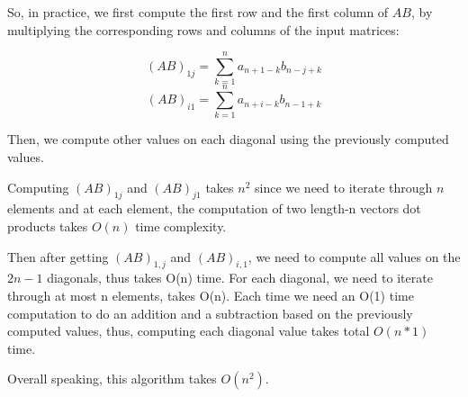 So, in practice, we first compute the first row and the first column of $AB$, by multiplying the corresponding rows and columns of the input matrices:

$$(AB)_{1 j}= \sum_{k=1}^{n}{a_{n+1-k}b_{n-j+k}}$$
$$(AB)_{i 1}= \sum_{k=1}^{n}{a_{n+i-k}b_{n-1+k}}$$

Then, we compute other values on each diagonal using the previously computed values. 


Computing $(AB)_{1 j}$ and $(AB)_{j 1}$ takes $n^2$ since we need to iterate through $n$ elements and at each element, the computation of two length-n vectors dot products takes $O(n)$ time complexity.

Then after getting $(AB)_{1,j}$ and $(AB)_{i,1}$, we need to compute all values on the $2n-1$ diagonals, thus takes O(n) time. For each diagonal, we need to iterate through at most n elements, takes O(n). Each time we need an O(1) time computation to do an addition and a subtraction based on the previously computed values, thus, computing each diagonal value takes total $O(n*1)$ time.

Overall speaking, this algorithm takes $O(n^2)$.





